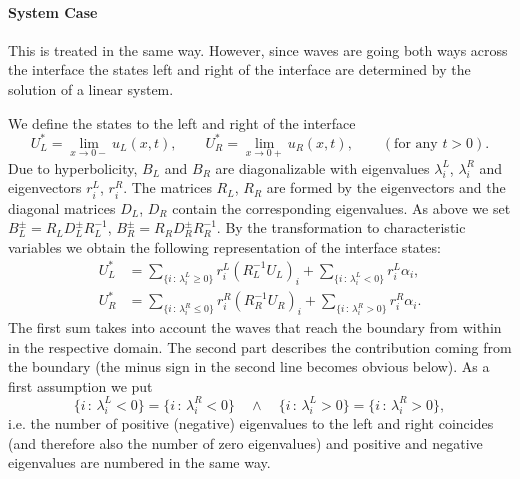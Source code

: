 \documentclass[a4paper,12pt]{article}
\theoremstyle{definition}
\theoremstyle{definition}
\begin{document}
\paragraph{System Case} This is treated in the same way. However, since waves are going
both ways across the interface the states left and right of the interface are determined by the
solution of a linear system.

We define the states to the left and right of the interface
\begin{equation*}
U_L^\ast = \lim_{x\to 0-} u_L(x,t), \qquad
U_R^\ast = \lim_{x\to 0+} u_R(x,t), \qquad
(\text{for any $t>0$}) .
\end{equation*}
Due to hyperbolicity, $B_L$ and $B_R$ are diagonalizable with
eigenvalues $\lambda_i^L$, $\lambda_i^R$ and eigenvectors $r_i^L$, $r_i^R$.
The matrices $R_L$, $R_R$ are formed by the eigenvectors and the diagonal
matrices $D_L$, $D_R$ contain the corresponding eigenvalues. As above we set
$B_L^\pm = R_LD_L^\pm R_L^{-1}$, $B_R^\pm = R_RD_R^\pm R_R^{-1}$.
By the transformation to characteristic variables we obtain the following representation
of the interface states:
\begin{align}
U_L^\ast &= \sum_{\{i \,:\, \lambda_i^L\geq 0\}} r_i^L (R_L^{-1} U_L)_i + \sum_{\{i \,:\, \lambda_i^L<0\}} r_i^L \alpha_i,\\
U_R^\ast &= \sum_{\{i \,:\, \lambda_i^R\leq 0\}} r_i^R (R_R^{-1} U_R)_i + \sum_{\{i \,:\, \lambda_i^R>0\}} r_i^R \alpha_i.
\end{align}
The first sum takes into account the waves that reach the boundary from within in the respective domain.
The second part describes the contribution coming from the boundary (the minus sign in the second line
becomes obvious below).
As a first assumption we put
\begin{equation}
\{i \,:\, \lambda_i^L < 0\} = \{i \,:\, \lambda_i^R < 0\} \quad\wedge\quad
\{i \,:\, \lambda_i^L > 0\} = \{i \,:\, \lambda_i^R > 0\},
\end{equation}
i.e. the number of positive (negative) eigenvalues to the left and right coincides
(and therefore also the number of zero eigenvalues) and positive
and negative eigenvalues are numbered in the same way.
\end{document}

